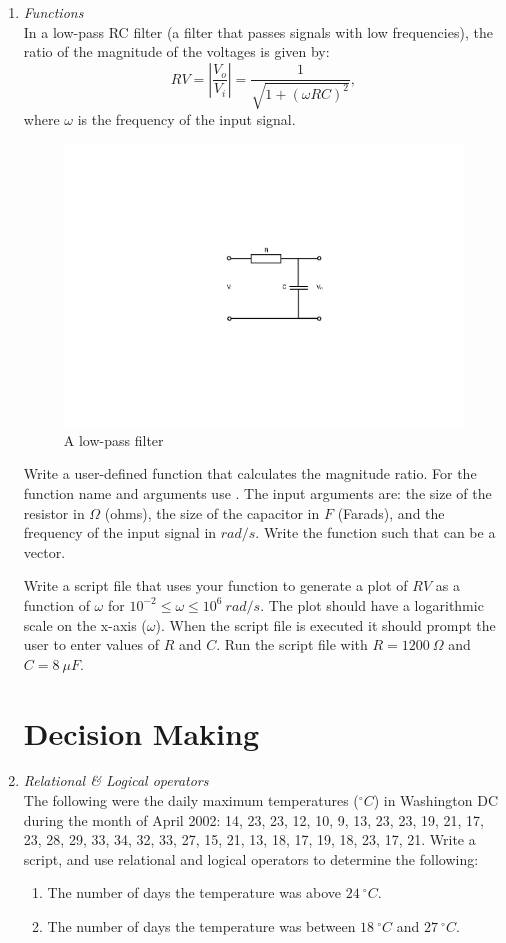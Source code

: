 \begin{enumerate}
\newpage
\item \textit{Functions}\\
In a low-pass RC filter (a filter that passes signals with low frequencies), the ratio of the magnitude of the voltages is given by:
\begin{equation*}
RV = \left| \frac{V_o}{V_i} \right| = \frac{1}{\sqrt{1+(\omega RC)^2}},
\end{equation*}
where $\omega$ is the frequency of the input signal. 
\begin{figure}[h]
	\myfloatalign
	\includegraphics[width=0.55\linewidth]{Graphics/Additional-Ex/lowpass}
	\caption{A low-pass filter}
	\label{fig:lowpass}
\end{figure}
Write a user-defined function that calculates the magnitude ratio. For the function name and arguments use . The input arguments are:  the size of the resistor in $\Omega$ (ohms),  the size of the capacitor in $F$ (Farads), and  the frequency of the input signal in $rad/s$. Write the function such that  can be a vector.

Write a script file that uses your  function to generate a plot of $RV$ as a function of $\omega$ for $10^{-2}\leq \omega \leq 10^6~rad/s$. The plot should have a logarithmic scale on the x-axis ($\omega$). When the script file is executed it should prompt the user to enter values of $R$ and $C$. Run the script file with $R=1200~\Omega$ and $C=8~\mu F$.

\newpage
\section{Decision Making} \label{sect:decisions}
\item \textit{Relational \& Logical operators}\\
The following were the daily maximum temperatures ($^\circ C$) in Washington DC during the month of April 2002: 14, 23, 23, 12, 10, 9, 13, 23, 23, 19, 21, 17, 23, 28, 29, 33, 34, 32, 33, 27, 15, 21, 13, 18, 17, 19, 18, 23, 17, 21. Write a script, and use relational and logical operators to determine the following:
\begin{enumerate}
\item The number of days the temperature was above $24~^\circ C$.
\item The number of days the temperature was between $18~^\circ C$ and $27~^\circ C$.
\end{enumerate}


\end{enumerate}
